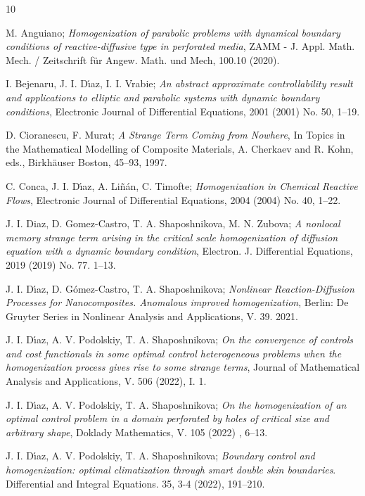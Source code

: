 \documentclass[reqno]{amsart}
\begin{document}
\begin{thebibliography}{10}

 M. Anguiano;
\emph{Homogenization of parabolic problems with
dynamical boundary conditions of reactive-diffusive type in perforated
media}, ZAMM - J. Appl. Math. Mech. / Zeitschrift f\"{u}r Angew. Math. und
Mech, 100.10 (2020).

 I. Bejenaru, J. I. D\'{\i}az, I. I. Vrabie;
\emph{An abstract approximate controllability result and applications to elliptic
and parabolic systems with dynamic boundary conditions}, Electronic Journal of
Differential Equations, 2001 (2001) No. 50, 1--19.

 D. Cioranescu, F. Murat;
\emph{A Strange Term Coming from Nowhere}, 
In Topics in the Mathematical Modelling of Composite
Materials, A. Cherkaev and R. Kohn, eds., Birkh{\"{a}}user Boston, 45--93,
1997.

 C. Conca, J. I. D\'{\i}az, A. Li\~{n}\'{a}n,  C. Timofte;
\emph{Homogenization in Chemical Reactive Flows}, Electronic Journal of
Differential Equations, 2004 (2004) No. 40, 1--22.

 J. I. Diaz, D. Gomez-Castro, T. A. Shaposhnikova, M. N. Zubova;
\emph{A nonlocal memory strange term arising in the critical scale
homogenization of diffusion equation with a dynamic boundary condition},
Electron. J. Differential Equations, 2019 (2019) No. 77. 1--13.

 J. I. D\'{\i}az, D. G\'{o}mez-Castro, T. A. Shaposhnikova;
\emph{Nonlinear Reaction-Diffusion Processes for Nanocomposites.
Anomalous improved homogenization}, Berlin: De Gruyter Series in Nonlinear
Analysis and Applications, V. 39. 2021.

 J. I. D\'{\i}az, A. V. Podolskiy, T. A. Shaposhnikova;
\emph{On the convergence of controls and cost functionals in some
optimal control heterogeneous problems when the homogenization process gives
rise to some strange terms}, Journal of Mathematical Analysis and
Applications, V. 506 (2022), I. 1.

 J. I. D\'{\i}az, A. V. Podolskiy,  T. A. Shaposhnikova;
\emph{On the homogenization of an optimal control problem in a
domain perforated by holes of critical size and arbitrary shape}, 
Doklady Mathematics, V. 105 (2022) , 6--13.

 J. I. D\'{\i}az, A. V. Podolskiy, T. A. Shaposhnikova;
\emph{Boundary control and homogenization: optimal climatization
through smart double skin boundaries}. Differential and Integral Equations.
35, 3-4 (2022), 191--210.


\end{thebibliography}
\end{document}
